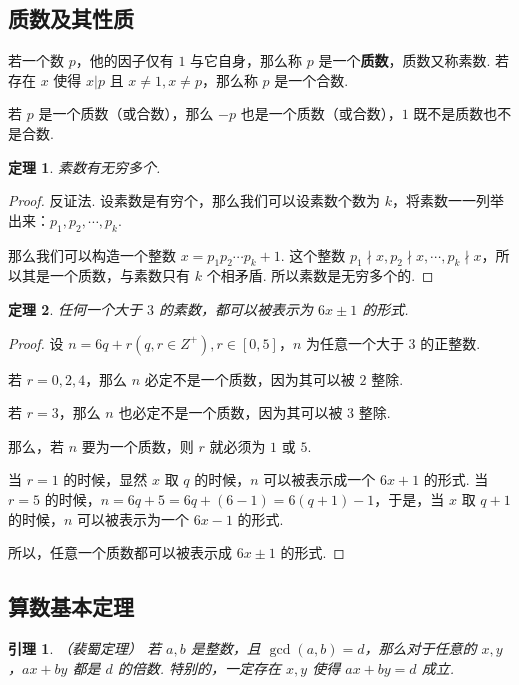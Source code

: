 \documentclass[a4paper]{article}
\newtheorem{theorem}{定理}[section]
\newtheorem{lemma}{引理}[section]
\begin{document}
\subsection{质数及其性质}

若一个数 $p$，他的因子仅有 $1$ 与它自身，那么称 $p$ 是一个\textbf{质数}，质数又称素数. 若存在 $x$ 使得 $x|p$ 且 $x
    \ne 1,x\ne p$，那么称 $p$ 是一个合数.

若 $p$ 是一个质数（或合数），那么 $-p$ 也是一个质数（或合数），$1$ 既不是质数也不是合数.

\newpage

\begin{theorem}
    素数有无穷多个.
\end{theorem}

\begin{proof}
    反证法. 设素数是有穷个，那么我们可以设素数个数为 $k$，将素数一一列举出来：$p_1,p_2,\cdots,p_k$.

    那么我们可以构造一个整数 $x=p_1p_2\cdots p_k+1$. 这个整数 $p_1\nmid x,p_2\nmid x,\cdots,p_k\nmid x$，所
    以其是一个质数，与素数只有 $k$ 个相矛盾. 所以素数是无穷多个的.
\end{proof}

\begin{theorem}
    任何一个大于 $3$ 的素数，都可以被表示为 $6x\pm 1$ 的形式.
\end{theorem}

\begin{proof}
    设 $n=6q+r(q,r\in Z^+),r \in [0,5]$，$n$ 为任意一个大于 $3$ 的正整数.

    若 $r=0,2,4$，那么 $n$ 必定不是一个质数，因为其可以被 $2$ 整除.

    若 $r=3$，那么 $n$ 也必定不是一个质数，因为其可以被 $3$ 整除.

    那么，若 $n$ 要为一个质数，则 $r$ 就必须为 $1$ 或 $5$.

    当 $r=1$ 的时候，显然 $x$ 取 $q$ 的时候，$n$ 可以被表示成一个 $6x+1$ 的形式. 当 $r=5$ 的时候，$n=6q+5=6q+
        (6-1)=6(q+1)-1$，于是，当 $x$ 取 $q+1$ 的时候，$n$ 可以被表示为一个 $6x-1$ 的形式.

    所以，任意一个质数都可以被表示成 $6x\pm 1$ 的形式.
\end{proof}

\subsection{算数基本定理}

\begin{lemma}{（裴蜀定理）}
    若 $a,b$ 是整数，且 $\gcd(a,b)=d$，那么对于任意的 $x,y$，$ax+by$ 都是 $d$ 的倍数. 特别的，一定存在 $x,y$
    使得 $ax+by=d$ 成立. 
\end{lemma}
\end{document}
